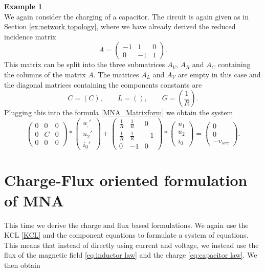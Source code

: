 \textbf{Example 1} \label{ex:MNA} \\
We again consider the charging of a capacitor. The circuit is again given as in Section \ref{ex:network topology}, where we have already derived the reduced incidence matrix
\begin{displaymath}
	A = 
	\left(
	\begin{matrix}
		-1 & 1 & 0 \\
		0 & -1 & 1 
	\end{matrix}
	\right).
\end{displaymath} 
 This matrix can be split into the three submatrices $A_V$, $A_R$ and $A_C$ containing the columns of the matrix $A$. The matrices $A_L$ and $A_V$ are empty in this case and the diagonal matrices containing the components constants are
 \begin{displaymath}
 	C = (C), \qquad L = (), \qquad G = (\frac{1}{R}).
 \end{displaymath}
Plugging this into the formula \eqref{MNA_Matrixform} we obtain the system
\begin{displaymath}
	\begin{pmatrix}
		0 & 0 & 0 \\
		0 & C & 0 \\
		0 & 0 & 0
	\end{pmatrix}
	*
	\begin{pmatrix}
		u_,' \\
		u_2' \\
		i_0'
	\end{pmatrix}
	+
	\begin{pmatrix}
		\frac{1}{R} & \frac{1}{R} & 0 \\
		\frac{1}{R} & \frac{1}{R} & -1 \\
		0 & -1 & 0 
	\end{pmatrix}
	*
	\begin{pmatrix}
		u_1 \\
		u_2 \\
		i_0
	\end{pmatrix}
	=
	\begin{pmatrix}
		0 \\
		0 \\
		-v_{src}
	\end{pmatrix}.
\end{displaymath}

\section{Charge-Flux oriented formulation of MNA}
\label{sec:charge flux oriented formulation}
 This time we derive the charge and flux based formulations. We again use the KCL \eqref{KCL} and the component equations to formulate a system of equations. This means that instead of directly using current and voltage, we instead use the flux of the magnetic field \eqref{eq:inductor law} and the charge \eqref{eq:capacitor law}. We then obtain

